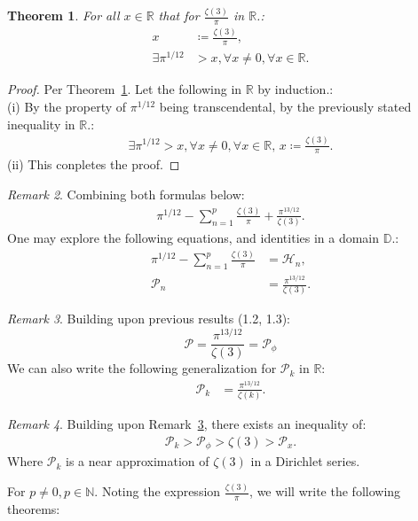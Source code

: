 \documentclass[10pt]{article}
\theoremstyle{plain}
\newtheorem{theorem}{Theorem}[section]
\theoremstyle{definition}
\theoremstyle{remark}
\newtheorem{remark}[theorem]{Remark}
\begin{document}
\begin{theorem}
\label{theo:first-zeta}
For all $x \in \mathbb{R}$ that for $\frac{\zeta(3)}{\pi}$ in $\mathbb{R}$.:
\begin{align*}
	x &\coloneq \frac{\zeta(3)}{\pi},\\
	\exists \pi^{1/12} &> x, \forall x \neq 0, \forall x \in \mathbb{R}.
\end{align*}
\end{theorem}
\begin{proof}
Per Theorem~\ref{theo:first-zeta}. Let the following in $\mathbb{R}$ by induction.:\\(i) By the property of $\pi^{1/12}$ being transcendental, by the previously stated inequality in $\mathbb{R}.$:
\begin{align*}
		\exists \pi^{1/12} > x, \forall x \neq 0, \forall x \in \mathbb{R}, \, x \coloneq \frac{\zeta(3)}{\pi}.
\end{align*}
(ii) This conpletes the proof.
\end{proof}
\begin{remark}
	\label{remark:sum-both}
	Combining both formulas below:
	\begin{align*}
		\pi^{1/12} - \sum_{n=1}^{p}\frac{\zeta(3)}{\pi} + \frac{\pi^{13/12}}{\zeta(3)}.
	\end{align*}
	One may explore the following equations, and identities in a domain $\mathbb{D}.$:
	\begin{align*}
		\pi^{1/12} - \sum_{n=1}^{p}\frac{\zeta(3)}{\pi} &= \mathcal{H}_n,\\
		\mathcal{P}_n &= \frac{\pi^{13/12}}{\zeta(3)}.
	\end{align*}
\end{remark}
\begin{remark}
\label{remark:frac-zeta}
	Building upon previous results (1.2, 1.3):
	\begin{equation}
		\mathcal{P} = \frac{\pi^{13/12}}{\zeta(3)} = \mathcal{P}_\phi
	\end{equation}
	We can also write the following generalization for $\mathcal{P}_k$ in $\mathbb{R}$:
	\begin{align*}
		\mathcal{P}_k &= \frac{\pi^{13/12}}{\zeta(k)}.
	\end{align*}
\end{remark}
\begin{remark}
	Building upon Remark~\ref{remark:frac-zeta}, there exists an inequality of:
	\begin{align*}
		\mathcal{P}_k > \mathcal{P}_\phi > \zeta(3) > \mathcal{P}_x. 
	\end{align*}
	Where $\mathcal{P}_k$ is a near approximation of $\zeta(3)$ in a Dirichlet series.
\end{remark} For $p \neq 0, p \in \mathbb{N}$. Noting the expression $\frac{\zeta(3)}{\pi}$, we will write the following theorems:
\end{document}
